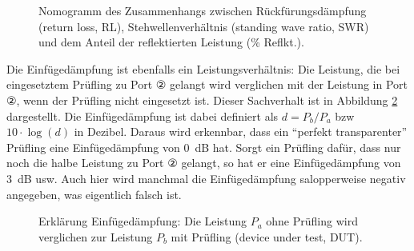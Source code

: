 \documentclass[twoside,a4paper,11pt,halfparskip,DIV=11,notitlepage]{scrartcl}
\begin{document}
\begin{figure}[t]
\begin{center}
\end{center}
    \caption{Nomogramm des Zusammenhangs zwischen Rückfürungsdämpfung (return loss, RL),
    Stehwellenverhältnis (standing wave ratio, SWR) und dem Anteil der reflektierten Leistung (\% Reflkt.).}
    \label{fig:rlnomogramm}
\end{figure}


Die Einfügedämpfung ist ebenfalls ein Leistungsverhältnis: Die Leistung, die
bei eingesetztem Prüfling zu Port ② gelangt wird verglichen mit der Leistung
in Port ②, wenn der Prüfling nicht eingesetzt ist. Dieser Sachverhalt ist in
Abbildung \ref{fig:insertionloss} dargestellt. Die Einfügedämpfung ist dabei
definiert als $d=P_b/P_a$ bzw $10\cdot\log{(d)}$ in Dezibel. Daraus wird erkennbar,
dass ein ``perfekt transparenter'' Prüfling eine Einfügedämpfung von 0~dB
hat. Sorgt ein Prüfling dafür, dass nur noch die halbe Leistung zu Port ②
gelangt, so hat er eine Einfügedämpfung von 3~dB usw. Auch hier wird manchmal
die Einfügedämpfung salopperweise negativ angegeben, was eigentlich falsch ist.

\begin{figure}[H]
    \begin{center}

        \vspace{5mm}

    \end{center}
    \caption{Erklärung Einfügedämpfung: Die Leistung $P_a$ ohne Prüfling wird
    verglichen zur Leistung $P_b$ mit Prüfling (device under test, DUT).}
    \label{fig:insertionloss}
\end{figure}
\end{document}
